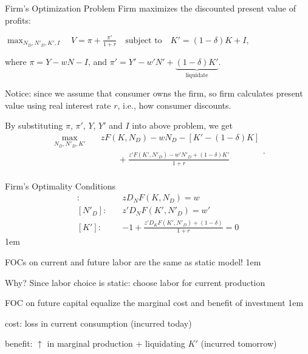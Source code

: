 \documentclass[11pt,aspectratio=43]{beamer}
\let\olditemize=\itemize
\let\endolditemize=\enditemize
\renewenvironment{itemize}{\olditemize \itemsep1em}{\endolditemize}
\theoremstyle{definition}
\begin{document}
\begin{frame}{Firm's Optimization Problem}
\label{slide:Firm_s_Optimization_Problem}
    Firm maximizes the discounted present value of profits:
    \begin{center}
        $ \displaystyle \max_{N_{D}, N'_{D}, K', I} \quad V = \pi + \frac{\pi' }{1+r} \quad \text{subject to} \quad K' = ( 1-\delta )K + I,$
    \end{center}
    where $ \pi = Y - wN - I $, and $ \pi' = Y' - w'N' + \underbrace{( 1-\delta )K'}_{\text{liquidate}} $.

    Notice: since we assume that \alert{consumer owns the firm}, so firm calculates present value using \alert{real interest rate $ r $}, i.e., how consumer discounts.

    By substituting $ \pi $, $ \pi' $, $ Y $, $ Y' $ and $ I $ into above problem, we get
    \begin{equation}
    \label{eq:firm_problem}
        \begin{split}
            \max_{N_{D}, N'_{D}, K'} \quad
                & z F( K, N_{D} ) - w N_{D} - [ K' - ( 1-\delta )K ]
            \\
                & \qquad + \frac{z' F( K', N'_{D} ) - w' N'_{D} + ( 1-\delta ) K'}{1+r}
            \\
        \end{split}
    .\end{equation}
\end{frame}

\begin{frame}{Firm's Optimality Conditions}
\label{slide:Firm_s_Optimality_Conditions}
    \begin{align*}
        [ N_{D} ]: \quad
            & z D_{N}F( K, N_{D} ) = w
        \\
        [ N'_{D} ]: \quad
            & z' D_{N}F( K', N'_{D} ) = w'
        \\
        [ K' ]: \quad
            & -1 + \frac{z' D_{K} F( K', N'_{D} ) + (1-\delta)}{1+r} = 0
    \end{align*}
    \begin{itemize}
        \item FOCs on current and future labor are \alert{the same} as static model!
        \begin{itemize}
            \item Why? Since labor choice is \alert{static}: choose labor for \alert{current} production
        \end{itemize}
        \item FOC on future capital equalize the \alert{marginal cost and benefit} of investment
        \begin{itemize}
            \item cost: loss in current consumption (incurred today)
            \item benefit: $ \uparrow  $ in marginal production $ + $ liquidating $ K' $ (incurred tomorrow)
        \end{itemize}
    \end{itemize}
\end{frame}
\end{document}
